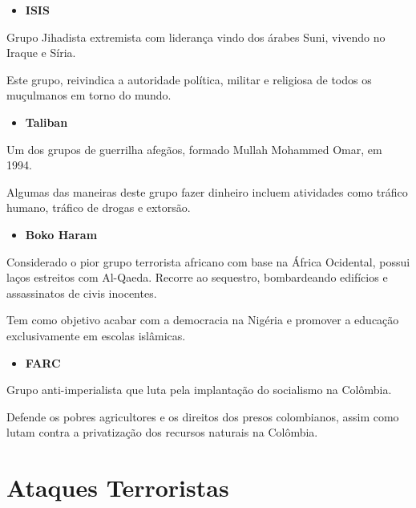 \documentclass{report}
\begin{document}
\begin{itemize}
 \item \textbf{ISIS}
\end{itemize}
\par
Grupo Jihadista extremista com liderança vindo dos árabes Suni, vivendo no Iraque e Síria.\par
Este grupo, reivindica a autoridade política, militar e religiosa de todos os muçulmanos em torno do mundo.

\begin{itemize}
 \item \textbf{Taliban}
\end{itemize}
\par
Um dos grupos de guerrilha afegãos, formado Mullah Mohammed Omar, em 1994.\par 
Algumas das maneiras deste grupo fazer dinheiro incluem atividades como tráfico humano, tráfico de drogas e extorsão.

\begin{itemize}
 \item \textbf{Boko Haram}
\end{itemize}
\par
Considerado o pior grupo terrorista africano com base na África Ocidental, possui laços estreitos com Al-Qaeda. Recorre ao sequestro, bombardeando edifícios e assassinatos de civis inocentes.\par
Tem como objetivo acabar com a democracia na Nigéria e promover a educação exclusivamente em escolas islâmicas. 

\begin{itemize}
 \item \textbf{FARC}
\end{itemize}
\par
Grupo anti-imperialista que luta pela implantação do socialismo na Colômbia.\par 
Defende os pobres agricultores e os direitos dos presos colombianos, assim como lutam contra a privatização dos recursos naturais na Colômbia. 



\chapter{Ataques Terroristas}
\label{chap.Ataques Terroristas}
\end{document}
